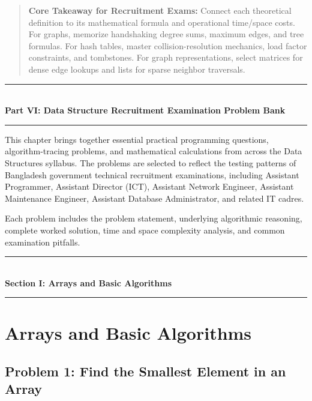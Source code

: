 \begin{quote}
\textbf{Core Takeaway for Recruitment Exams:} Connect each theoretical definition to its mathematical formula and operational time/space costs. For graphs, memorize handshaking degree sums, maximum edges, and tree formulas. For hash tables, master collision-resolution mechanics, load factor constraints, and tombstones. For graph representations, select matrices for dense edge lookups and lists for sparse neighbor traversals.
\end{quote}


\begin{center}
\vspace{1em}
{\color{primary}\rule{0.5\textwidth}{1.5pt}}\\[6pt]
{\Large\bfseries\color{primary} Part VI: Data Structure Recruitment Examination Problem Bank}\\[3pt]
{\color{primary}\rule{0.5\textwidth}{1.5pt}}
\vspace{1em}
\end{center}

This chapter brings together essential practical programming questions, algorithm-tracing problems, and mathematical calculations from across the Data Structures syllabus. The problems are selected to reflect the testing patterns of Bangladesh government technical recruitment examinations, including Assistant Programmer, Assistant Director (ICT), Assistant Network Engineer, Assistant Maintenance Engineer, Assistant Database Administrator, and related IT cadres.

Each problem includes the problem statement, underlying algorithmic reasoning, complete worked solution, time and space complexity analysis, and common examination pitfalls.

\begin{center}
\vspace{0.5em}
{\color{primary}\rule{0.45\textwidth}{1.2pt}}\\[4pt]
{\Large\bfseries\color{primary} Section I: Arrays and Basic Algorithms}\\[2pt]
{\color{primary}\rule{0.45\textwidth}{1.2pt}}
\vspace{0.5em}
\end{center}

\section{Arrays and Basic Algorithms}

\subsection{Problem 1: Find the Smallest Element in an Array}

